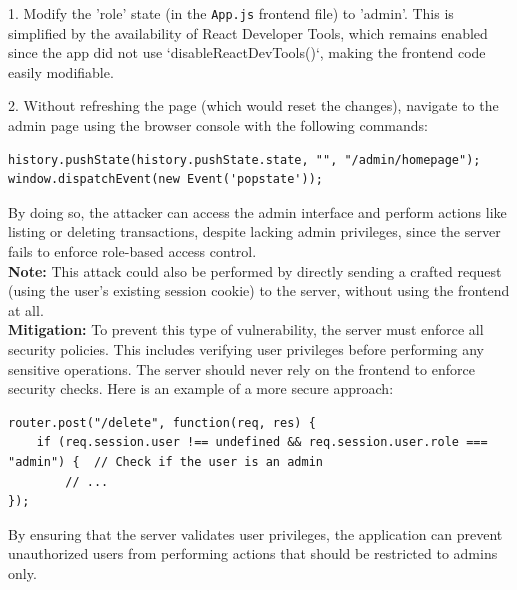 \documentclass[]{article}
\begin{document}
1. Modify the 'role' state (in the \texttt{App.js} frontend file) to 'admin'. This is simplified by the availability of React Developer Tools, which remains enabled since the app did not use `disableReactDevTools()`, making the frontend code easily modifiable.
   
2. Without refreshing the page (which would reset the changes), navigate to the admin page using the browser console with the following commands:
\begin{lstlisting}
history.pushState(history.pushState.state, "", "/admin/homepage");
window.dispatchEvent(new Event('popstate'));
\end{lstlisting}
By doing so, the attacker can access the admin interface and perform actions like listing or deleting transactions, despite lacking admin privileges, since the server fails to enforce role-based access control. \\ 
\textbf{Note:} This attack could also be performed by directly sending a crafted request (using the user's existing session cookie) to the server, without using the frontend at all. \\ 
\textbf{Mitigation:}
To prevent this type of vulnerability, the server must enforce all security policies. This includes verifying user privileges before performing any sensitive operations. The server should never rely on the frontend to enforce security checks. Here is an example of a more secure approach:

\begin{lstlisting}
router.post("/delete", function(req, res) {
    if (req.session.user !== undefined && req.session.user.role === "admin") {  // Check if the user is an admin
        // ...
});
\end{lstlisting}
By ensuring that the server validates user privileges, the application can prevent unauthorized users from performing actions that should be restricted to admins only.
\end{document}
